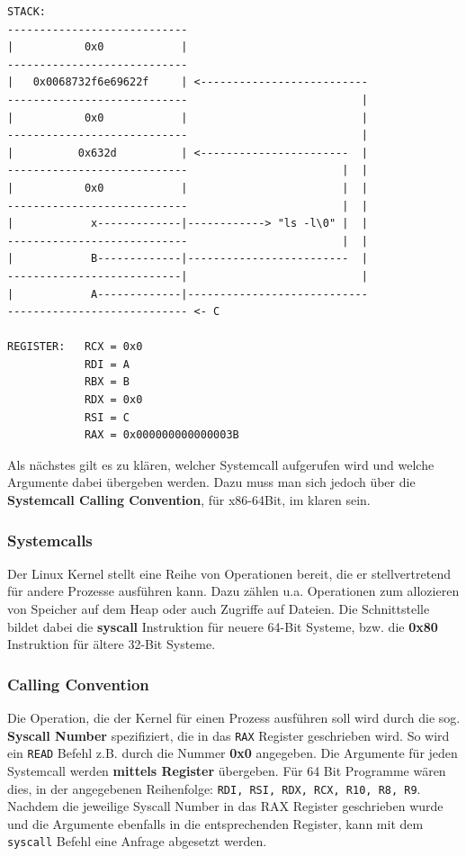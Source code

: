 \documentclass[12pt]{article}
\begin{document}
\begin{lstlisting}
STACK:
----------------------------
|           0x0            |    
----------------------------
|   0x0068732f6e69622f     | <--------------------------
----------------------------                           |
|           0x0            |                           |
----------------------------                           |
|          0x632d          | <-----------------------  |
----------------------------                        |  |
|           0x0            |                        |  |
----------------------------                        |  |
|            x-------------|------------> "ls -l\0" |  |
----------------------------                        |  |
|            B-------------|-------------------------  |
---------------------------|                           |
|            A-------------|----------------------------
---------------------------- <- C

REGISTER:   RCX = 0x0
            RDI = A
            RBX = B
            RDX = 0x0
            RSI = C
            RAX = 0x000000000000003B

\end{lstlisting}

Als nächstes gilt es zu klären, welcher Systemcall aufgerufen wird und welche Argumente dabei übergeben werden. Dazu muss man sich jedoch über die \textbf{Systemcall Calling Convention}, für x86-64Bit, im klaren sein.

\subsubsection{Systemcalls}
Der Linux Kernel stellt eine Reihe von Operationen bereit, die er stellvertretend für andere Prozesse ausführen kann. Dazu zählen u.a. Operationen zum allozieren von Speicher auf dem Heap oder auch Zugriffe auf Dateien. Die Schnittstelle bildet dabei die \textbf{syscall} Instruktion für neuere 64-Bit Systeme, bzw. die \textbf{0x80} Instruktion für ältere 32-Bit Systeme.

\subsubsection*{Calling Convention}
Die Operation, die der Kernel für einen Prozess ausführen soll wird durch die sog. \textbf{Syscall Number} spezifiziert, die in das \texttt{RAX} Register geschrieben wird. So wird ein \texttt{READ} Befehl z.B. durch die Nummer \textbf{0x0} angegeben.
\newline
\newline
Die Argumente für jeden Systemcall werden \textbf{mittels Register} übergeben. Für 64 Bit Programme wären dies, in der angegebenen Reihenfolge: \texttt{RDI, RSI, RDX, RCX, R10, R8, R9}.
\newline
\newline
Nachdem die jeweilige Syscall Number in das RAX Register geschrieben wurde und die Argumente ebenfalls in die entsprechenden Register, kann mit dem \texttt{syscall} Befehl eine Anfrage abgesetzt werden.
\end{document}
